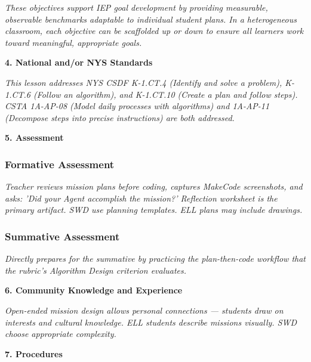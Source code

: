 \documentclass[11pt,letterpaper]{article}
\begin{document}
\textit{These objectives support IEP goal development by providing measurable, observable benchmarks adaptable to individual student plans. In a heterogeneous classroom, each objective can be scaffolded up or down to ensure all learners work toward meaningful, appropriate goals.}

\textbf{4. National and/or NYS Standards}

\textit{This lesson addresses NYS CSDF K-1.CT.4 (Identify and solve a problem), K-1.CT.6 (Follow an algorithm), and K-1.CT.10 (Create a plan and follow steps). CSTA 1A-AP-08 (Model daily processes with algorithms) and 1A-AP-11 (Decompose steps into precise instructions) are both addressed.}


\newpage
\textbf{5. Assessment}

\subsubsection{Formative Assessment}

\textit{Teacher reviews mission plans before coding, captures MakeCode screenshots, and asks: 'Did your Agent accomplish the mission?' Reflection worksheet is the primary artifact. SWD use planning templates. ELL plans may include drawings.}

\subsubsection{Summative Assessment}

\textit{Directly prepares for the summative by practicing the plan-then-code workflow that the rubric's Algorithm Design criterion evaluates.}

\textbf{6. Community Knowledge and Experience}

\textit{Open-ended mission design allows personal connections --- students draw on interests and cultural knowledge. ELL students describe missions visually. SWD choose appropriate complexity.}

\textbf{7. Procedures}
\end{document}
